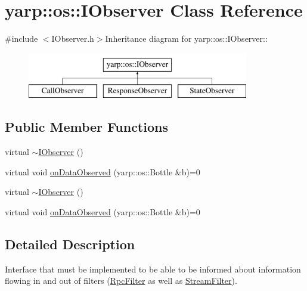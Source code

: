 \hypertarget{classyarp_1_1os_1_1_i_observer}{
\section{yarp::os::IObserver Class Reference}
\label{classyarp_1_1os_1_1_i_observer}
}


{\ttfamily \#include $<$IObserver.h$>$}Inheritance diagram for yarp::os::IObserver::\begin{figure}[H]
\begin{center}
\leavevmode
\includegraphics[height=2cm]{classyarp_1_1os_1_1_i_observer}
\end{center}
\end{figure}
\subsection*{Public Member Functions}
\begin{DoxyCompactItemize}
\item 
virtual \hyperlink{classyarp_1_1os_1_1_i_observer_a6e20a4a7baa318b53d6a7e3f198699f6}{$\sim$IObserver} ()
\item 
virtual void \hyperlink{classyarp_1_1os_1_1_i_observer_a4829e5a6f2ba6666b9539a4a30f20790}{onDataObserved} (yarp::os::Bottle \&b)=0
\item 
virtual \hyperlink{classyarp_1_1os_1_1_i_observer_a6e20a4a7baa318b53d6a7e3f198699f6}{$\sim$IObserver} ()
\item 
virtual void \hyperlink{classyarp_1_1os_1_1_i_observer_a4829e5a6f2ba6666b9539a4a30f20790}{onDataObserved} (yarp::os::Bottle \&b)=0
\end{DoxyCompactItemize}


\subsection{Detailed Description}
Interface that must be implemented to be able to be informed about information flowing in and out of filters (\hyperlink{classyarp_1_1os_1_1_rpc_filter}{RpcFilter} as well as \hyperlink{classyarp_1_1os_1_1_stream_filter}{StreamFilter}). 

